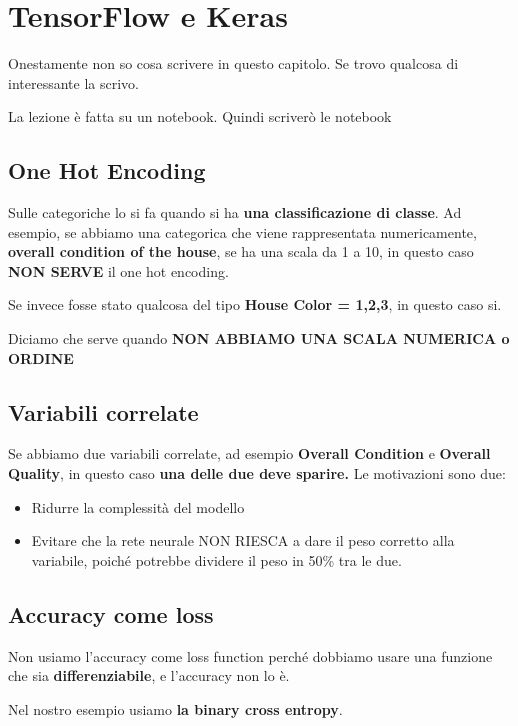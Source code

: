 \section{TensorFlow e Keras}

Onestamente non so cosa scrivere in questo capitolo. Se trovo qualcosa di
interessante la scrivo.

La lezione è fatta su un notebook. Quindi scriverò le notebook

\subsection{One Hot Encoding}

Sulle categoriche lo si fa quando si ha \textbf{una classificazione di classe}.
Ad esempio, se abbiamo una categorica che viene rappresentata numericamente,
\textbf{overall condition of the house}, se ha una scala da 1 a 10, in questo
caso \textbf{NON SERVE} il one hot encoding.

Se invece fosse stato qualcosa del tipo \textbf{House Color = 1,2,3}, in questo
caso si.

Diciamo che serve quando \textbf{NON ABBIAMO UNA SCALA NUMERICA o ORDINE}

\subsection{Variabili correlate}

Se abbiamo due variabili correlate, ad esempio \textbf{Overall Condition} e
\textbf{Overall Quality}, in questo caso \textbf{una delle due deve sparire.}
Le motivazioni sono due:
\begin{itemize}
    \item Ridurre la complessità del modello
    \item Evitare che la rete neurale NON RIESCA a dare il peso corretto alla variabile,
          poiché potrebbe dividere il peso in 50\% tra le due.
\end{itemize}

\subsection{Accuracy come loss}

Non usiamo l'accuracy come loss function perché dobbiamo usare una funzione che
sia \textbf{differenziabile}, e l'accuracy non lo è.

Nel nostro esempio usiamo \textbf{la binary cross entropy}.

